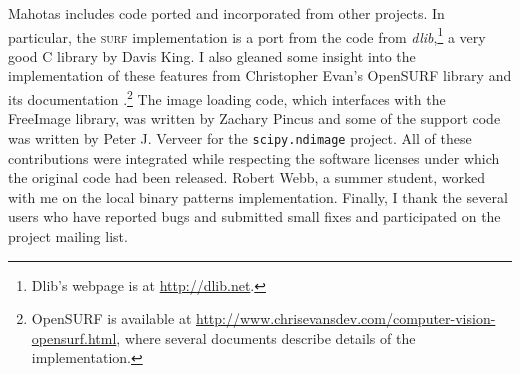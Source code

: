 \documentclass{article}
\newcommand*{\cpp}{{C\nolinebreak[4]\hspace{-.05em}\raisebox{.4ex}{\tiny\textbf{++}}}}
\let\code\texttt
\begin{document}
Mahotas includes code ported and incorporated from other projects. In
particular, the \textsc{surf} implementation is a port from the code from
\textit{dlib},\footnote{Dlib's webpage is at \url{http://dlib.net}.} a very
good \cpp{} library by Davis King. I also gleaned some insight into the
implementation of these features from Christopher Evan's OpenSURF library and
its documentation \citep{evans2009}.\footnote{OpenSURF is available at
\url{http://www.chrisevansdev.com/computer-vision-opensurf.html}, where several
documents describe details of the implementation.} The image loading code,
which interfaces with the FreeImage library, was written by Zachary Pincus and
some of the support code was written by Peter J. Verveer for the
\code{scipy.ndimage} project. All of these contributions were integrated while
respecting the software licenses under which the original code had been
released. Robert Webb, a summer student, worked with me on the local binary
patterns implementation. Finally, I thank the several users who have reported
bugs and submitted small fixes and participated on the project mailing list.

\printbibliography
\end{document}
